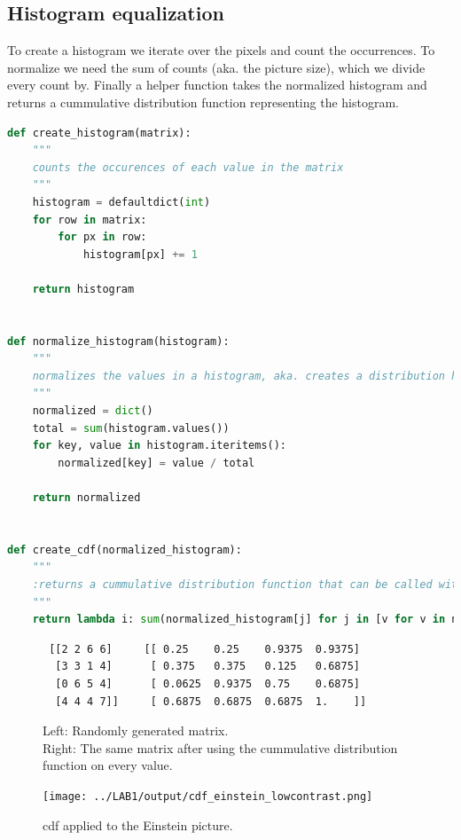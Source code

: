 \clearpage
\subsection*{Histogram equalization}

To create a histogram we iterate over the pixels and count the occurrences.
To normalize we need the sum of counts (aka. the picture size), which we divide every count by.
Finally a helper function takes the normalized histogram and returns a cummulative distribution function representing the histogram.

\begin{lstlisting}[language=Python, label=input_range, caption=Input range stretching]
def create_histogram(matrix):
    """
    counts the occurences of each value in the matrix
    """
    histogram = defaultdict(int)
    for row in matrix:
        for px in row:
            histogram[px] += 1

    return histogram


def normalize_histogram(histogram):
    """
    normalizes the values in a histogram, aka. creates a distribution histogram
    """
    normalized = dict()
    total = sum(histogram.values())
    for key, value in histogram.iteritems():
        normalized[key] = value / total

    return normalized


def create_cdf(normalized_histogram):
    """
    :returns a cummulative distribution function that can be called with a value parameter
    """
    return lambda i: sum(normalized_histogram[j] for j in [v for v in normalized_histogram.keys() if v <= i])
\end{lstlisting}

\newpage
\begin{figure}[h!]
    \centering
 \begin{verbatim}
 [[2 2 6 6]     [[ 0.25    0.25    0.9375  0.9375]
  [3 3 1 4]      [ 0.375   0.375   0.125   0.6875]
  [0 6 5 4]      [ 0.0625  0.9375  0.75    0.6875]
  [4 4 4 7]]     [ 0.6875  0.6875  0.6875  1.    ]]
 \end{verbatim}
 \caption{Left: Randomly generated matrix.\\
 Right: The same matrix after using the cummulative distribution function on every value.}
\end{figure}

\begin{figure}[h!]
    \centering
    \texttt{[image: ../LAB1/output/cdf\_einstein\_lowcontrast.png]}
    \caption{cdf applied to the Einstein picture.}
\end{figure}



